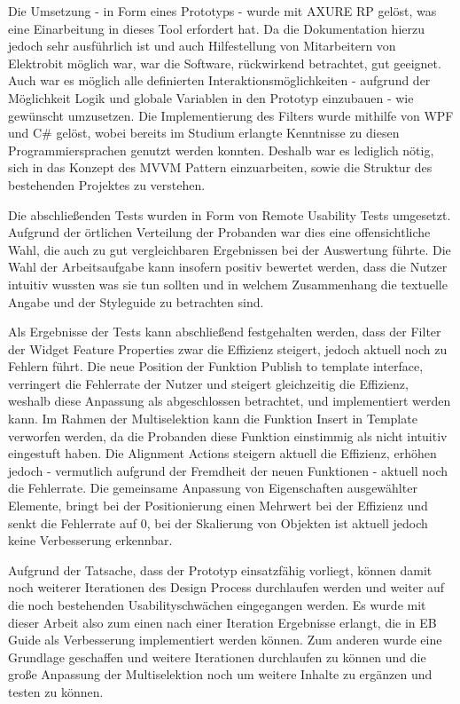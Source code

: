 Die Umsetzung - in Form eines Prototyps - wurde mit AXURE RP gelöst, was eine Einarbeitung in dieses Tool erfordert hat.
Da die Dokumentation hierzu jedoch sehr ausführlich ist und auch Hilfestellung von Mitarbeitern von Elektrobit möglich war, war die Software, rückwirkend betrachtet, gut geeignet.
Auch war es möglich alle definierten Interaktionsmöglichkeiten - aufgrund der Möglichkeit Logik und globale Variablen in den Prototyp einzubauen - wie gewünscht umzusetzen.
Die Implementierung des Filters wurde mithilfe von WPF und C\# gelöst, wobei bereits im Studium erlangte Kenntnisse zu diesen Programmiersprachen genutzt werden konnten.
Deshalb war es lediglich nötig, sich in das Konzept des MVVM Pattern einzuarbeiten, sowie die Struktur des bestehenden Projektes zu verstehen.

Die abschließenden Tests wurden in Form von Remote Usability Tests umgesetzt.
Aufgrund der örtlichen Verteilung der Probanden war dies eine offensichtliche Wahl, die auch zu gut vergleichbaren Ergebnissen bei der Auswertung führte.
Die Wahl der Arbeitsaufgabe kann insofern positiv bewertet werden, dass die Nutzer intuitiv wussten was sie tun sollten und in welchem Zusammenhang die textuelle Angabe und der Styleguide zu betrachten sind.

Als Ergebnisse der Tests kann abschließend festgehalten werden, dass der Filter der Widget Feature Properties zwar die Effizienz steigert, jedoch aktuell noch zu Fehlern führt.
Die neue Position der Funktion \glqq Publish to template interface\grqq{}, verringert die Fehlerrate der Nutzer und steigert gleichzeitig die Effizienz, weshalb diese Anpassung als abgeschlossen betrachtet, und implementiert werden kann.
Im Rahmen der Multiselektion kann die Funktion \glqq Insert in Template\grqq{} verworfen werden, da die Probanden diese Funktion einstimmig als nicht intuitiv eingestuft haben.
Die \glqq Alignment Actions\grqq{} steigern aktuell die Effizienz, erhöhen jedoch - vermutlich aufgrund der Fremdheit der neuen Funktionen - aktuell noch die Fehlerrate.
Die gemeinsame Anpassung von Eigenschaften ausgewählter Elemente, bringt bei der Positionierung einen Mehrwert bei der Effizienz und senkt die Fehlerrate auf 0, bei der Skalierung von Objekten ist aktuell jedoch keine Verbesserung erkennbar.

Aufgrund der Tatsache, dass der Prototyp einsatzfähig vorliegt, können damit noch weiterer Iterationen des Design Process durchlaufen werden und weiter auf die noch bestehenden Usabilityschwächen eingegangen werden.
Es wurde mit dieser Arbeit also zum einen nach einer Iteration Ergebnisse erlangt, die in EB Guide als Verbesserung implementiert werden können.
Zum anderen wurde eine Grundlage geschaffen und weitere Iterationen durchlaufen zu können und die große Anpassung der Multiselektion noch um weitere Inhalte zu ergänzen und testen zu können.
